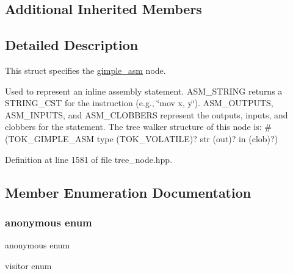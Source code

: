 \subsection*{Additional Inherited Members}


\subsection{Detailed Description}
This struct specifies the \hyperlink{structgimple__asm}{gimple\+\_\+asm} node. 

Used to represent an inline assembly statement. A\+S\+M\+\_\+\+S\+T\+R\+I\+NG returns a S\+T\+R\+I\+N\+G\+\_\+\+C\+ST for the instruction (e.\+g., \char`\"{}mov x, y\char`\"{}). A\+S\+M\+\_\+\+O\+U\+T\+P\+U\+TS, A\+S\+M\+\_\+\+I\+N\+P\+U\+TS, and A\+S\+M\+\_\+\+C\+L\+O\+B\+B\+E\+RS represent the outputs, inputs, and clobbers for the statement. The tree walker structure of this node is\+: \#(T\+O\+K\+\_\+\+G\+I\+M\+P\+L\+E\+\_\+\+A\+SM type (T\+O\+K\+\_\+\+V\+O\+L\+A\+T\+I\+LE)? str (out)? in (clob)?) 

Definition at line 1581 of file tree\+\_\+node.\+hpp.



\subsection{Member Enumeration Documentation}
\mbox{\label{structgimple__asm_a244c4ddd4d7b2a2c7873a70ed2c3fabe}} 
\subsubsection{\texorpdfstring{anonymous enum}{anonymous enum}}
{\footnotesize\ttfamily anonymous enum}



visitor enum 

